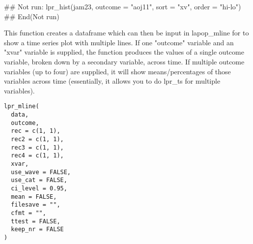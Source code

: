 \documentclass[a4paper]{book}
\begin{document}
%
\begin{Examples}
\begin{ExampleCode}
## Not run: 
lpr_hist(jam23,
outcome = "aoj11",
sort = "xv",
order = "hi-lo")
## End(Not run)
\end{ExampleCode}
\end{Examples}
%
\begin{Description}
This function creates a dataframe which can then be input in lapop\_mline for
to show a time series plot with multiple lines.  If one "outcome" variable and an
"xvar" variable is supplied, the function produces the values of a single outcome
variable, broken down by a secondary variable, across time.  If multiple outcome
variables (up to four) are supplied, it will show means/percentages of those
variables across time (essentially, it allows you to do lpr\_ts for multiple variables).
\end{Description}
%
\begin{Usage}
\begin{verbatim}
lpr_mline(
  data,
  outcome,
  rec = c(1, 1),
  rec2 = c(1, 1),
  rec3 = c(1, 1),
  rec4 = c(1, 1),
  xvar,
  use_wave = FALSE,
  use_cat = FALSE,
  ci_level = 0.95,
  mean = FALSE,
  filesave = "",
  cfmt = "",
  ttest = FALSE,
  keep_nr = FALSE
)
\end{verbatim}
\end{Usage}
%
\end{document}
